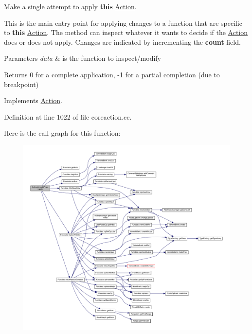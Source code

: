 Make a single attempt to apply {\bfseries{this}} \mbox{\hyperlink{class_action}{Action}}. 

This is the main entry point for applying changes to a function that are specific to {\bfseries{this}} \mbox{\hyperlink{class_action}{Action}}. The method can inspect whatever it wants to decide if the \mbox{\hyperlink{class_action}{Action}} does or does not apply. Changes are indicated by incrementing the {\bfseries{count}} field. 
\begin{DoxyParams}{Parameters}
{\em data} & is the function to inspect/modify \\
\hline
\end{DoxyParams}
\begin{DoxyReturn}{Returns}
0 for a complete application, -\/1 for a partial completion (due to breakpoint) 
\end{DoxyReturn}


Implements \mbox{\hyperlink{class_action_aac1c3999d6c685b15f5d9765a4d04173}{Action}}.



Definition at line 1022 of file coreaction.\+cc.

Here is the call graph for this function\+:
\nopagebreak
\begin{figure}[H]
\begin{center}
\leavevmode
\includegraphics[width=350pt]{class_action_varnode_props_a531c9985eb2e6a5796009bea79a465fe_cgraph}
\end{center}
\end{figure}
\mbox{\label{class_action_varnode_props_a5703787530b66de1bea8f6b33091d68f}} 
